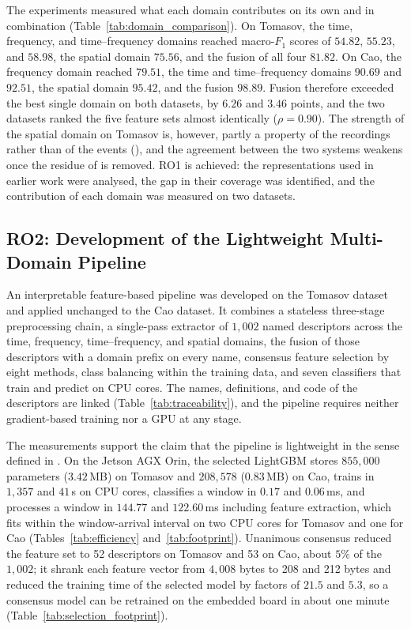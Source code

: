 The experiments measured what each domain contributes on its own and in combination (Table~\ref{tab:domain_comparison}). On Tomasov, the time, frequency, and time--frequency domains reached macro-$F_1$ scores of $54.82$, $55.23$, and $58.98$, the spatial domain $75.56$, and the fusion of all four $81.82$. On Cao, the frequency domain reached $79.51$, the time and time--frequency domains $90.69$ and $92.51$, the spatial domain $95.42$, and the fusion $98.89$. Fusion therefore exceeded the best single domain on both datasets, by $6.26$ and $3.46$ points, and the two datasets ranked the five feature sets almost identically ($\rho = 0.90$). The strength of the spatial domain on Tomasov is, however, partly a property of the recordings rather than of the events (), and the agreement between the two systems weakens once the residue of  is removed. RO1 is achieved: the representations used in earlier work were analysed, the gap in their coverage was identified, and the contribution of each domain was measured on two datasets.

\subsection{RO2: Development of the Lightweight Multi-Domain Pipeline}
\label{sec:chap5RO2}
An interpretable feature-based pipeline was developed on the Tomasov dataset and applied unchanged to the Cao dataset. It combines a stateless three-stage preprocessing chain, a single-pass extractor of $1{,}002$ named descriptors across the time, frequency, time--frequency, and spatial domains, the fusion of those descriptors with a domain prefix on every name, consensus feature selection by eight methods, class balancing within the training data, and seven classifiers that train and predict on CPU cores. The names, definitions, and code of the descriptors are linked (Table~\ref{tab:traceability}), and the pipeline requires neither gradient-based training nor a GPU at any stage.

The measurements support the claim that the pipeline is lightweight in the sense defined in . On the Jetson AGX Orin, the selected LightGBM stores $855{,}000$ parameters ($3.42$\,MB) on Tomasov and $208{,}578$ ($0.83$\,MB) on Cao, trains in $1{,}357$ and $41$\,s on CPU cores, classifies a window in $0.17$ and $0.06$\,ms, and processes a window in $144.77$ and $122.60$\,ms including feature extraction, which fits within the window-arrival interval on two CPU cores for Tomasov and one for Cao (Tables~\ref{tab:efficiency} and~\ref{tab:footprint}). Unanimous consensus reduced the feature set to 52 descriptors on Tomasov and 53 on Cao, about $5\%$ of the $1{,}002$; it shrank each feature vector from $4{,}008$ bytes to 208 and 212 bytes and reduced the training time of the selected model by factors of $21.5$ and $5.3$, so a consensus model can be retrained on the embedded board in about one minute (Table~\ref{tab:selection_footprint}).

